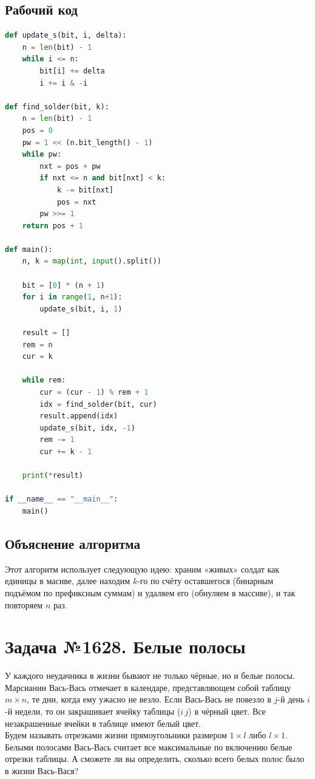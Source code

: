 \documentclass[a4paper,12pt]{article}
\begin{document}
\subsection*{Рабочий код}
\begin{lstlisting}[language=python]
def update_s(bit, i, delta):
    n = len(bit) - 1
    while i <= n:
        bit[i] += delta
        i += i & -i

def find_solder(bit, k):
    n = len(bit) - 1
    pos = 0
    pw = 1 << (n.bit_length() - 1)
    while pw:
        nxt = pos + pw
        if nxt <= n and bit[nxt] < k:
            k -= bit[nxt]
            pos = nxt
        pw >>= 1
    return pos + 1

def main():
    n, k = map(int, input().split())

    bit = [0] * (n + 1)
    for i in range(1, n+1):
        update_s(bit, i, 1)

    result = []
    rem = n
    cur = k

    while rem:
        cur = (cur - 1) % rem + 1 
        idx = find_solder(bit, cur)
        result.append(idx)
        update_s(bit, idx, -1)
        rem -= 1
        cur += k - 1     

    print(*result)

if __name__ == "__main__":
    main()
\end{lstlisting}
\subsection*{Объяснение алгоритма}
Этот алгоритм использует следующую идею: храним «живых» солдат как единицы в масиве, далее находим $k$-го по счёту оставшегося (бинарным подъёмом по префиксным суммам) и удаляем его (обнуляем в массиве), и так повторяем $n$ раз.

\newpage
\section*{Задача №1628. Белые полосы}
У каждого неудачника в жизни бывают не только чёрные, но и белые полосы. Марсианин Вась‑Вась отмечает в календаре, представляющем собой таблицу $m \times n$, те дни, когда ему ужасно не везло. Если Вась‑Вась не повезло в $j$-й день $i$-й недели, то он закрашивает ячейку таблицы ($i\, j$) в чёрный цвет. Все незакрашенные ячейки в таблице имеют белый цвет.\\[0.5em]
Будем называть отрезками жизни прямоугольники размером \(1 \times l\) либо \(l \times 1\). Белыми полосами Вась‑Вась считает все максимальные по включению белые отрезки таблицы. А сможете ли вы определить, сколько всего белых полос было в жизни Вась‑Вася?\\[1em]
\end{document}
